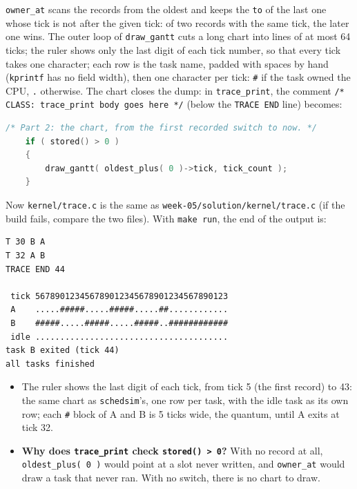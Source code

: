 \texttt{owner\_at} scans the records from the oldest and keeps the \texttt{to} of the last one whose tick is not after the given tick: of two records with the same tick, the later one wins. The outer loop of \texttt{draw\_gantt} cuts a long chart into lines of at most 64 ticks; the ruler shows only the last digit of each tick number, so that every tick takes one character; each row is the task name, padded with spaces by hand (\texttt{kprintf} has no field width), then one character per tick: \texttt{\#} if the task owned the CPU, \texttt{.} otherwise. The chart closes the dump: in \texttt{trace\_print}, the comment \texttt{/* CLASS: trace\_print body goes here */} (below the \texttt{TRACE END} line) becomes:
\begin{lstlisting}[language=C]
    /* Part 2: the chart, from the first recorded switch to now. */
    if ( stored() > 0 )
    {
        draw_gantt( oldest_plus( 0 )->tick, tick_count );
    }
\end{lstlisting}
Now \texttt{kernel/trace.c} is the same as \texttt{week-05/solution/kernel/trace.c} (if the build fails, compare the two files). With \texttt{make run}, the end of the output is:
\begin{verbatim}
T 30 B A
T 32 A B
TRACE END 44

 tick 567890123456789012345678901234567890123
 A    .....#####.....#####.....##............
 B    #####.....#####.....#####..############
 idle .......................................
task B exited (tick 44)
all tasks finished
\end{verbatim}
\begin{itemize}
    \item The ruler shows the last digit of each tick, from tick 5 (the first record) to 43: the same chart as \texttt{schedsim}'s, one row per task, with the idle task as its own row; each \texttt{\#} block of A and B is 5 ticks wide, the quantum, until A exits at tick 32.
    \item \textbf{Why does \texttt{trace\_print} check \texttt{stored() > 0}?} With no record at all, \texttt{oldest\_plus( 0 )} would point at a slot never written, and \texttt{owner\_at} would draw a task that never ran. With no switch, there is no chart to draw.
\end{itemize}

